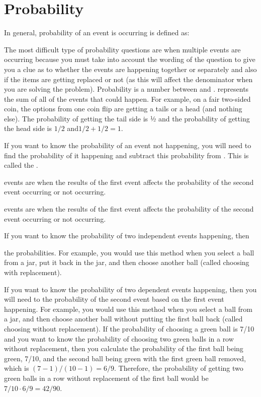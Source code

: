 \documentclass[12pt]{book}
\newcommand{\longline}{\underline{\hspace{2in}} }
\newcommand{\shortline}{\underline{\hspace{1in}}}
\begin{document}
\vfill
\newpage
\section{Probability}

In general, probability of an event is occurring is defined as:

\vfill
The most difficult type of probability questions are when multiple events are occurring because you must take into account the wording of the question to give you a clue as to whether the events are happening together or separately and also if the items are getting replaced or not (as this will affect the denominator when you are solving the problem). 
Probability is a number between \shortline and \shortline. \shortline represents the sum of all of the events that could happen. For example, on a fair two-sided coin, the options from one coin flip are getting a tails or a head (and nothing else). The probability of getting the tail side is ½ and the probability of getting the head side is $1/2$ and$1/2 + 1/2 =1$.

\vfill
If you want to know the probability of an event not happening, you will need to find the probability of it happening and subtract this probability from \shortline. This is called the \longline.

\vfill
\longline events are when the results of the first event affects the probability of the second event occurring or not occurring.

\vfill
\longline events are when the results of the first event affects the probability of the second event occurring or not occurring.

\vfill
If you want to know the probability of two independent events happening, then

\longline the probabilities. For example, you would use this method when you select a ball from a jar, put it back in the jar, and then choose another ball (called choosing with replacement).

\vfill
If you want to know the probability of two dependent events happening, then you will need to \longline the probability of the second event based on the first event happening. For example, you would use this method when you select a ball from a jar, and then choose another ball without putting the first ball back (called choosing without replacement).  If the probability of choosing a green ball is 7/10 and you want to know the probability of choosing two green balls in a row without replacement, then you calculate the probability of the first ball being green, 7/10, and the second ball being green with the first green ball removed, which is $(7 - 1)/(10 - 1) = 6/9$. Therefore, the probability of getting two green balls in a row without replacement of the first ball would be $7/10 \cdot 6/9 = 42/90$.
\end{document}
